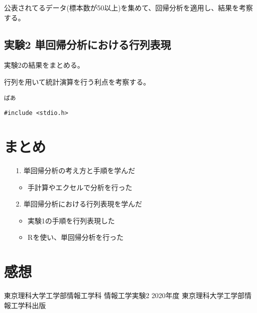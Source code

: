 \documentclass[12pt]{jarticle}
\begin{document}
\begin{shadebox}
    公表されてるデータ(標本数が50以上)を集めて、回帰分析を適用し、結果を考察する。
\end{shadebox}

\subsection{実験2 単回帰分析における行列表現}
\begin{shadebox}
    実験2の結果をまとめる。
\end{shadebox}

\begin{shadebox}
    行列を用いて統計演算を行う利点を考察する。
\end{shadebox}


\begin{lstlisting}[style=log]
    ぱあ
\end{lstlisting}

\begin{lstlisting}[caption=read\_2\_1byte.c,label=read,style = lstR]
    #include <stdio.h>
\end{lstlisting}


\section{まとめ}
\begin{itemize}
    \item [1.]単回帰分析の考え方と手順を学んだ
          \begin{itemize}
              \item 手計算やエクセルで分析を行った
          \end{itemize}
    \item [2.]単回帰分析における行列表現を学んだ
          \begin{itemize}
              \item 実験1の手順を行列表現した
              \item Rを使い、単回帰分析を行った
          \end{itemize}
\end{itemize}

\section{感想}


\clearpage
\begin{thebibliography}{99}
    \label{sannkoubunnkenn_chapter}
    東京理科大学工学部情報工学科 情報工学実験2 2020年度
    東京理科大学工学部情報工学科出版
\end{thebibliography}

\clearpage

\appendix
\end{document}

